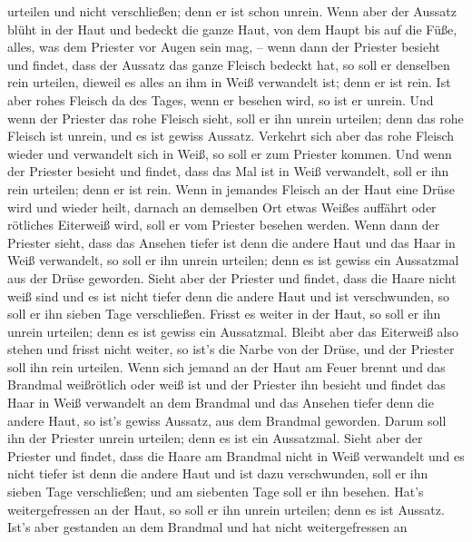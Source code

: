 urteilen und nicht verschließen; denn er ist schon unrein. 
Wenn aber der Aussatz blüht in der Haut und bedeckt die ganze Haut, von
dem Haupt bis auf die Füße, alles, was dem Priester vor Augen sein mag,
--  wenn dann der Priester besieht und findet, dass der
Aussatz das ganze Fleisch bedeckt hat, so soll er denselben rein
urteilen, dieweil es alles an ihm in Weiß verwandelt ist; denn er ist
rein.  Ist aber rohes Fleisch da des Tages, wenn er besehen
wird, so ist er unrein.  Und wenn der Priester das rohe
Fleisch sieht, soll er ihn unrein urteilen; denn das rohe Fleisch ist
unrein, und es ist gewiss Aussatz.  Verkehrt sich aber das
rohe Fleisch wieder und verwandelt sich in Weiß, so soll er zum Priester
kommen.  Und wenn der Priester besieht und findet, dass das
Mal ist in Weiß verwandelt, soll er ihn rein urteilen; denn er ist rein.
 Wenn in jemandes Fleisch an der Haut eine Drüse wird und
wieder heilt,  darnach an demselben Ort etwas Weißes
auffährt oder rötliches Eiterweiß wird, soll er vom Priester besehen
werden.  Wenn dann der Priester sieht, dass das Ansehen
tiefer ist denn die andere Haut und das Haar in Weiß verwandelt, so soll
er ihn unrein urteilen; denn es ist gewiss ein Aussatzmal aus der Drüse
geworden.  Sieht aber der Priester und findet, dass die
Haare nicht weiß sind und es ist nicht tiefer denn die andere Haut und
ist verschwunden, so soll er ihn sieben Tage verschließen. 
Frisst es weiter in der Haut, so soll er ihn unrein urteilen; denn es
ist gewiss ein Aussatzmal.  Bleibt aber das Eiterweiß also
stehen und frisst nicht weiter, so ist's die Narbe von der Drüse, und
der Priester soll ihn rein urteilen.  Wenn sich jemand an
der Haut am Feuer brennt und das Brandmal weißrötlich oder weiß ist
 und der Priester ihn besieht und findet das Haar in Weiß
verwandelt an dem Brandmal und das Ansehen tiefer denn die andere Haut,
so ist's gewiss Aussatz, aus dem Brandmal geworden. Darum soll ihn der
Priester unrein urteilen; denn es ist ein Aussatzmal. 
Sieht aber der Priester und findet, dass die Haare am Brandmal nicht in
Weiß verwandelt und es nicht tiefer ist denn die andere Haut und ist
dazu verschwunden, soll er ihn sieben Tage verschließen; 
und am siebenten Tage soll er ihn besehen. Hat's weitergefressen an der
Haut, so soll er ihn unrein urteilen; denn es ist Aussatz. 
Ist's aber gestanden an dem Brandmal und hat nicht weitergefressen an

